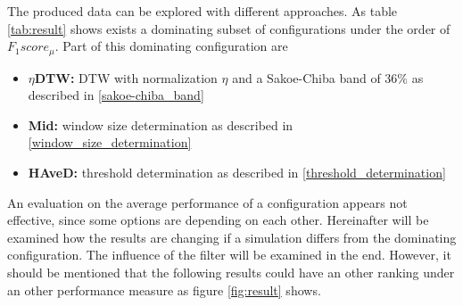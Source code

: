 The produced data can be explored with different approaches. As table \ref{tab:result} shows exists a dominating subset
of configurations under the order of $F_{1}score_{\mu}$. Part of this dominating configuration are
\begin{itemize}
    \item \textbf{$\eta$DTW:} DTW with normalization $\eta$ and a Sakoe-Chiba band of 36\% as described in
    \ref{sakoe-chiba_band}
    \item \textbf{Mid:} window size determination as described in \ref{window_size_determination}
    \item \textbf{HAveD:} threshold determination as described in \ref{threshold_determination}
\end{itemize}
An evaluation on the average performance of a configuration appears not effective, since some options are depending on
each other. Hereinafter will be examined how the results are changing if a simulation differs from the dominating
configuration. The influence of the filter will be examined in the end. However, it should be mentioned that the
following results could have an other ranking under an other performance measure as figure \ref{fig:result} shows.

